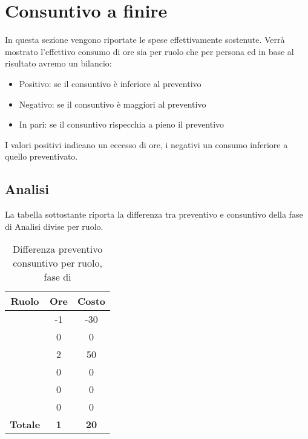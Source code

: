 \section{Consuntivo a finire}
In questa sezione vengono riportate le spese effettivamente sostenute. Verrà mostrato l’effettivo consumo di ore sia per ruolo che per persona ed in base al risultato avremo un bilancio:
\begin{itemize}
	\item Positivo: se il consuntivo è inferiore al preventivo
	\item Negativo: se il consuntivo è maggiori al preventivo
	\item In pari: se il consuntivo rispecchia a pieno il preventivo
\end{itemize}
I valori positivi indicano un eccesso di ore, i negativi un consumo inferiore a quello preventivato.

\subsection{Analisi}
La tabella sottostante riporta la differenza tra preventivo e consuntivo della fase di Analisi divise per ruolo.
\begin{table}[H]
	\centering
	\begin{tabular}{|c|c|c|}
		\hline
		\textbf{Ruolo} &
		\textbf{Ore} &
		\textbf{Costo} \\
		\hline
		\Responsabile & -1 & -30\\
		\hline
		\Amministratore & 0 & 0\\
		\hline
		\Analista & 2 & 50\\
		\hline
		\Progettista & 0 & 0 \\
		\hline
		\Verificatore & 0 & 0\\
		\hline
		\Programmatore & 0 & 0 \\
		\hline
		\textbf{Totale} & \textbf{1} & \textbf{20} \\
		\hline
	\end{tabular}
	\caption{Differenza preventivo consuntivo per ruolo, fase di \AR}
\end{table}


